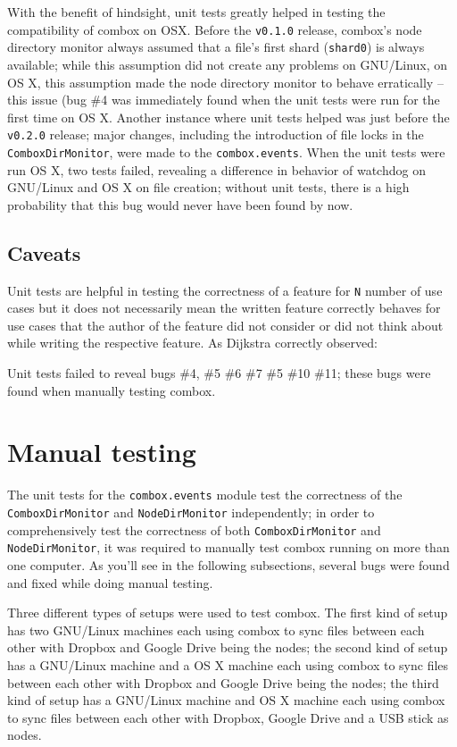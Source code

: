 With the benefit of hindsight, unit tests greatly helped in testing
the compatibility of combox on OSX. Before the \verb+v0.1.0+ release,
combox's node directory monitor always assumed that a file's first
shard (\verb+shard0+) is always available; while this assumption did
not create any problems on GNU/Linux, on OS X, this assumption made
the node directory monitor to behave erratically -- this issue (bug
\#4\cite{combox-issue-tracker} was immediately found when the unit
tests were run for the first time on OS X. Another instance where unit
tests helped was just before the \verb+v0.2.0+ release; major changes,
including the introduction of file locks in the
\verb+ComboxDirMonitor+, were made to the \verb+combox.events+. When
the unit tests were run OS X, two tests failed, revealing a difference
in behavior of watchdog\cite{pylib:watchdog} on GNU/Linux and OS X on
file creation\cite{combox-wd-fix}; without unit tests, there is a high
probability that this bug would never have been found by now.

\subsection{Caveats}

Unit tests are helpful in testing the correctness of a feature for
\verb+N+ number of use cases but it does not necessarily mean the
written feature correctly behaves for use cases that the author of the
feature did not consider or did not think about while writing the
respective feature. As Dijkstra correctly observed:

Unit tests failed to reveal bugs \#4, \#5 \#6 \#7 \#5 \#10
\#11\cite{combox-issue-tracker}; these bugs were found when manually
testing combox.

\section{Manual testing}\label{sec:5-manual-testing}

The unit tests for the \verb+combox.events+ module test the
correctness of the \verb+ComboxDirMonitor+ and \verb+NodeDirMonitor+
independently; in order to comprehensively test the correctness of
both \verb+ComboxDirMonitor+ and \verb+NodeDirMonitor+, it was
required to manually test combox running on more than one computer. As
you'll see in the following subsections, several bugs were found and
fixed while doing manual testing.

Three different types of setups were used to test combox. The first
kind of setup has two GNU/Linux machines each using combox to sync
files between each other with Dropbox and Google Drive being the
nodes; the second kind of setup has a GNU/Linux machine and a OS X
machine each using combox to sync files between each other with
Dropbox and Google Drive being the nodes; the third kind of setup has
a GNU/Linux machine and OS X machine each using combox to sync files
between each other with Dropbox, Google Drive and a USB stick as
nodes.

